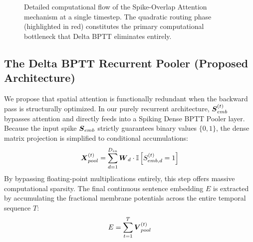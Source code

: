 \documentclass[10pt]{article} %
\begin{document}
\begin{figure}[t!]
\begin{center}
{%
}
\end{center}
\caption{Detailed computational flow of the Spike-Overlap Attention mechanism at a single timestep. The quadratic routing phase (highlighted in red) constitutes the primary computational bottleneck that Delta BPTT eliminates entirely.}
\label{fig:attention_mech}
\end{figure}


\subsection{The Delta BPTT Recurrent Pooler (Proposed Architecture)}
We propose that spatial attention is functionally redundant when the backward pass is structurally optimized. In our purely recurrent architecture, $\boldsymbol{S}_{emb}^{(t)}$ bypasses attention and directly feeds into a Spiking Dense BPTT Pooler layer. Because the input spike $\boldsymbol{S}_{emb}$ strictly guarantees binary values $\{0, 1\}$, the dense matrix projection is simplified to conditional accumulations:
\begin{equation}
\boldsymbol{X}_{pool}^{(t)} = \sum_{d=1}^{D_{in}} \boldsymbol{W}_{d} \cdot \mathbb{I}\left[ S_{emb, d}^{(t)} = 1 \right]
\end{equation}
By bypassing floating-point multiplications entirely, this step offers massive computational sparsity. The final continuous sentence embedding $E$ is extracted by accumulating the fractional membrane potentials across the entire temporal sequence $T$:
\begin{equation}
E = \sum_{t=1}^T \boldsymbol{V}_{pool}^{(t)}
\end{equation}
\end{document}
